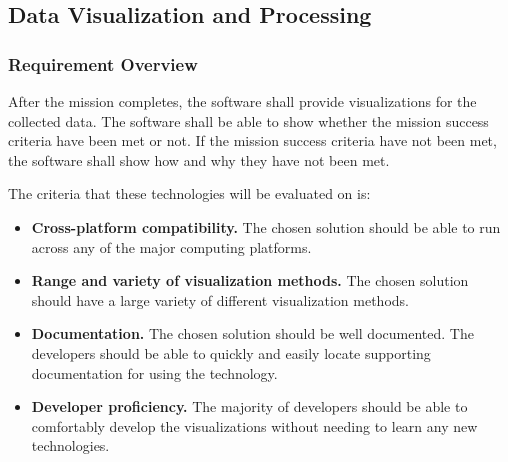 \documentclass[letterpaper,10pt]{article}
\begin{document}
\subsection{Data Visualization and Processing}
\subsubsection{Requirement Overview}
After the mission completes, the software shall provide visualizations for the collected data.
The software shall be able to show whether the mission success criteria have been met or not.
If the mission success criteria have not been met, the software shall show how and
why they have not been met.

The criteria that these technologies will be evaluated on is:
\begin{itemize}
\item \textbf{Cross-platform compatibility.}
The chosen solution should be able to run across any of the major computing platforms.

\item \textbf{Range and variety of visualization methods.}
The chosen solution should have a large variety of different visualization methods.

\item \textbf{Documentation.}
The chosen solution should be well documented.
The developers should be able to quickly and easily locate supporting documentation for using the technology.

\item \textbf{Developer proficiency.}
The majority of developers should be able to comfortably develop the visualizations
without needing to learn any new technologies.
\end{itemize}
\end{document}
